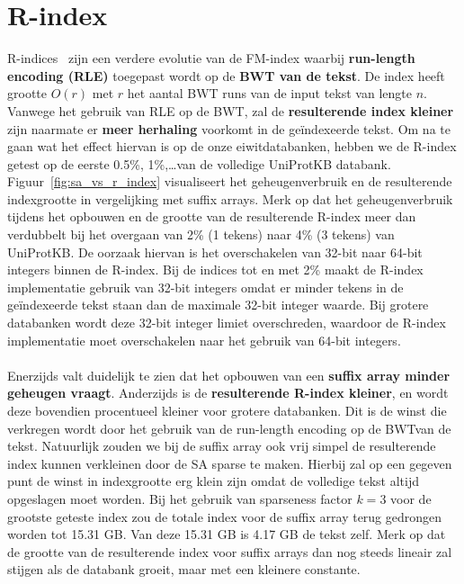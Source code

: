\section{R-index}\label{sec:r-index}
R-indices~\cite{r_index2, r_index1} zijn een verdere evolutie van de FM-index waarbij \textbf{run-length encoding (RLE)} toegepast wordt op de \textbf{BWT van de tekst}.
De index heeft grootte $O(r)$ met $r$ het aantal BWT runs van de input tekst van lengte $n$.
Vanwege het gebruik van RLE op de BWT, zal de \textbf{resulterende index kleiner} zijn naarmate er \textbf{meer herhaling} voorkomt in de geïndexeerde tekst.
Om na te gaan wat het effect hiervan is op de onze eiwitdatabanken, hebben we de R-index getest op de eerste 0.5\%, 1\%,\ldots\space van de volledige UniProtKB databank.
Figuur~\ref{fig:sa_vs_r_index} visualiseert het geheugenverbruik en de resulterende indexgrootte in vergelijking met suffix arrays.
Merk op dat het geheugenverbruik tijdens het opbouwen en de grootte van de resulterende R-index meer dan verdubbelt bij het overgaan van 2\% (1 tekens) naar 4\% (3 tekens) van UniProtKB\@.
De oorzaak hiervan is het overschakelen van 32-bit naar 64-bit integers binnen de R-index.
Bij de indices tot en met 2\% maakt de R-index implementatie gebruik van 32-bit integers omdat er minder tekens in de geïndexeerde tekst staan dan de maximale 32-bit integer waarde.
Bij grotere databanken wordt deze 32-bit integer limiet overschreden, waardoor de R-index implementatie moet overschakelen naar het gebruik van 64-bit integers.
\\ \\
Enerzijds valt duidelijk te zien dat het opbouwen van een \textbf{suffix array minder geheugen vraagt}.
Anderzijds is de \textbf{resulterende R-index kleiner}, en wordt deze bovendien procentueel kleiner voor grotere databanken.
Dit is de winst die verkregen wordt door het gebruik van de run-length encoding op de BWT\@ van de tekst.
Natuurlijk zouden we bij de suffix array ook vrij simpel de resulterende index kunnen verkleinen door de SA sparse te maken.
Hierbij zal op een gegeven punt de winst in indexgrootte erg klein zijn omdat de volledige tekst altijd opgeslagen moet worden.
Bij het gebruik van sparseness factor $k = 3$ voor de grootste geteste index zou de totale index voor de suffix array terug gedrongen worden tot 15.31 GB\@.
Van deze 15.31 GB is 4.17 GB de tekst zelf.
Merk op dat de grootte van de resulterende index voor suffix arrays dan nog steeds lineair zal stijgen als de databank groeit, maar met een kleinere constante.

